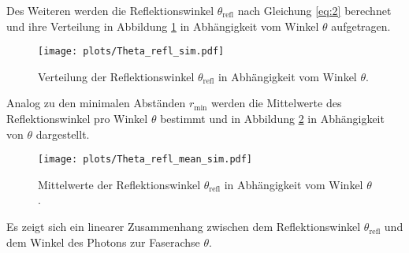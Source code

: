 Des Weiteren werden die Reflektionswinkel $\theta_\mathrm{refl}$ nach Gleichung \eqref{eq:2} berechnet und ihre Verteilung in Abbildung \ref{fig:Theta_refl_sim} in Abhängigkeit vom Winkel $\theta$ aufgetragen.
\begin{figure}
    \centering
    \texttt{[image: plots/Theta\_refl\_sim.pdf]}
    \caption{Verteilung der Reflektionswinkel $\theta_\mathrm{refl}$ in Abhängigkeit vom Winkel $\theta$. }
    \label{fig:Theta_refl_sim}
\end{figure} 
\FloatBarrier
Analog zu den minimalen Abständen $r_\mathrm{min}$ werden die Mittelwerte des Reflektionswinkel pro Winkel $\theta$ bestimmt und in Abbildung \ref{fig:Theta_refl_mean_sim} in Abhängigkeit von $\theta$ dargestellt.
\begin{figure}
    \centering
    \texttt{[image: plots/Theta\_refl\_mean\_sim.pdf]}
    \caption{Mittelwerte der Reflektionswinkel $\theta_\mathrm{refl}$ in Abhängigkeit vom Winkel $\theta$. }
    \label{fig:Theta_refl_mean_sim}
\end{figure} 
\FloatBarrier
Es zeigt sich ein linearer Zusammenhang zwischen dem Reflektionswinkel $\theta_\mathrm{refl}$ und dem Winkel des Photons zur Faserachse $\theta$.

